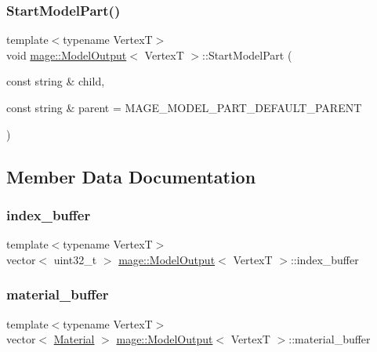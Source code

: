 \hypertarget{structmage_1_1_model_output_a86b2e4d9885193fb796b309e6104abc9}{}\label{structmage_1_1_model_output_a86b2e4d9885193fb796b309e6104abc9} 
\subsubsection{\texorpdfstring{Start\+Model\+Part()}{StartModelPart()}}
{\footnotesize\ttfamily template$<$typename VertexT$>$ \\
void \hyperlink{structmage_1_1_model_output}{mage\+::\+Model\+Output}$<$ VertexT $>$\+::Start\+Model\+Part (\begin{DoxyParamCaption}\item[{const string \&}]{child,  }\item[{const string \&}]{parent = {\ttfamily MAGE\+\_\+MODEL\+\_\+PART\+\_\+DEFAULT\+\_\+PARENT} }\end{DoxyParamCaption})}



\subsection{Member Data Documentation}
\hypertarget{structmage_1_1_model_output_a0c49359544b7d3c961118caa629f6405}{}\label{structmage_1_1_model_output_a0c49359544b7d3c961118caa629f6405} 
\subsubsection{\texorpdfstring{index\+\_\+buffer}{index\_buffer}}
{\footnotesize\ttfamily template$<$typename VertexT$>$ \\
vector$<$ uint32\+\_\+t $>$ \hyperlink{structmage_1_1_model_output}{mage\+::\+Model\+Output}$<$ VertexT $>$\+::index\+\_\+buffer}

\hypertarget{structmage_1_1_model_output_a66764a4d8c7e5b099e51013f385f13bf}{}\label{structmage_1_1_model_output_a66764a4d8c7e5b099e51013f385f13bf} 
\subsubsection{\texorpdfstring{material\+\_\+buffer}{material\_buffer}}
{\footnotesize\ttfamily template$<$typename VertexT$>$ \\
vector$<$ \hyperlink{structmage_1_1_material}{Material} $>$ \hyperlink{structmage_1_1_model_output}{mage\+::\+Model\+Output}$<$ VertexT $>$\+::material\+\_\+buffer}

